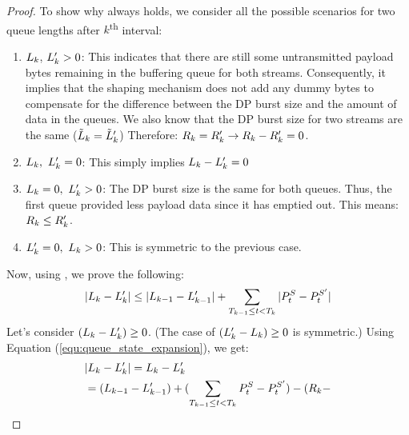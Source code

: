 \begin{proof}
    To show why  always holds, we consider all
    the possible scenarios for two queue lengths after $k$\textsuperscript{th}
    interval:
    \begin{enumerate}
        \item $L_{k}$, $L_{k}' > 0$: 
        This indicates that there are still some untransmitted payload bytes remaining in the buffering queue for both streams. 
        Consequently, it implies that the shaping mechanism does not add any dummy bytes to compensate for the difference between the DP burst size and the amount of data in the queues.
        We also know that the DP burst size for two streams are the same ($\tilde{L}_{k} = \tilde{L}_{k}'$)
        Therefore: ${R}_{k} = {R}_{k}' \rightarrow {R}_{k} -
        {R}_{k}' = 0$.
        \item $L_{k},~L_{k}' = 0$: This simply implies $L_{k} -
        L_{k}'=0$
        \item $L_{k} = 0,~L_{k}'>0$: The DP burst size is the
        same for both
        queues. Thus, the first queue provided less payload data since it has emptied
        out. This means: ${R}_{k} \leq {R}_{k}'$.
        \item $L_{k}' = 0,~L_{k}>0$: This is symmetric to the previous case.
    \end{enumerate}
    Now, using , we prove the following:
    \begin{align}
            |L_{k} - L_{k}'|
            \leq
            |L_{k-1} - L_{k-1}'|
            +
            \sum_{T_{k-1} \leq t < T_{k}}|P^S_t - P^{S'}_t|
    \end{align}
    Let's consider $(L_{k}-L_{k}') \geq 0$. (The case of
    $(L_{k}'-L_{k}) \geq 0$ is symmetric.)
    Using Equation (\ref{equ:queue_state_expansion}), we get:
    \begin{align*}
    \nonumber
    & |\qlent{k} - \qlent{k}'| = \qlent{k} - \qlent{k}'\\
    & = (\qlent{k-1} - \qlent{k-1}')
    +
    (\sum_{\dpintvl_{k-1} \leq t < \dpintvl_{k}}P^S_t - P^{S'}_t) - ({\payload}_{k} -

\end{align*}
\end{proof}
